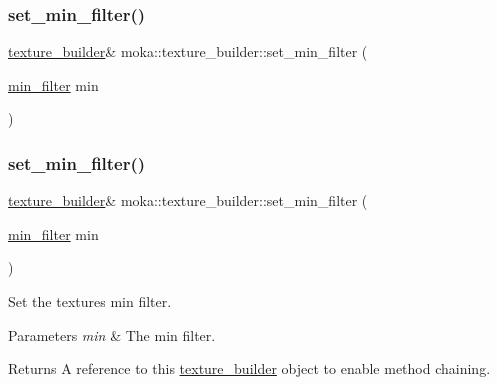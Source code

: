 \subsubsection{\texorpdfstring{set\_min\_filter()}{set\_min\_filter()}\hspace{0.1cm}{\footnotesize\ttfamily [1/2]}}
{\footnotesize\ttfamily \mbox{\hyperlink{classmoka_1_1texture__builder}{texture\+\_\+builder}}\& moka\+::texture\+\_\+builder\+::set\+\_\+min\+\_\+filter (\begin{DoxyParamCaption}\item[{\mbox{\hyperlink{namespacemoka_afeea6a53d61ee8561c91c62f5a051a77}{min\+\_\+filter}}}]{min }\end{DoxyParamCaption})}

\mbox{\label{classmoka_1_1texture__builder_a308c57f97f3d9477f0b15e31ef37cf4c}} 
\subsubsection{\texorpdfstring{set\_min\_filter()}{set\_min\_filter()}\hspace{0.1cm}{\footnotesize\ttfamily [2/2]}}
{\footnotesize\ttfamily \mbox{\hyperlink{classmoka_1_1texture__builder}{texture\+\_\+builder}}\& moka\+::texture\+\_\+builder\+::set\+\_\+min\+\_\+filter (\begin{DoxyParamCaption}\item[{\mbox{\hyperlink{namespacemoka_afeea6a53d61ee8561c91c62f5a051a77}{min\+\_\+filter}}}]{min }\end{DoxyParamCaption})}



Set the texture\textquotesingle{}s min filter. 


\begin{DoxyParams}{Parameters}
{\em min} & The min filter. \\
\hline
\end{DoxyParams}
\begin{DoxyReturn}{Returns}
A reference to this \mbox{\hyperlink{classmoka_1_1texture__builder}{texture\+\_\+builder}} object to enable method chaining. 
\end{DoxyReturn}
\mbox{\label{classmoka_1_1texture__builder_a5dd6e175a28e9dd958c08103e48e30d6}} 

